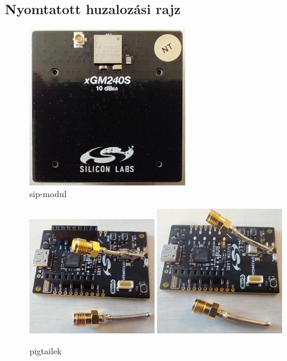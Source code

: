 \documentclass[a4paper,12pt,titlepage]{article}
\begin{document}
        \subsection{Nyomtatott huzalozási rajz}
            \begin{figure}
                \centering
                \includegraphics[width=0.6\textwidth]{kep/szerkesztett/sip-modul.jpg}
                \caption{sip-modul}
                \label{fig:sip}
            \end{figure}
%
            \begin{figure}
                \centering
                \includegraphics[width=0.48\textwidth]{kep/szerkesztett/pigtail1.jpg}
                \includegraphics[width=0.48\textwidth]{kep/szerkesztett/pigtail2.jpg}
                \caption{pigtailek}
                \label{fig:pigtail}
            \end{figure}
\end{document}
